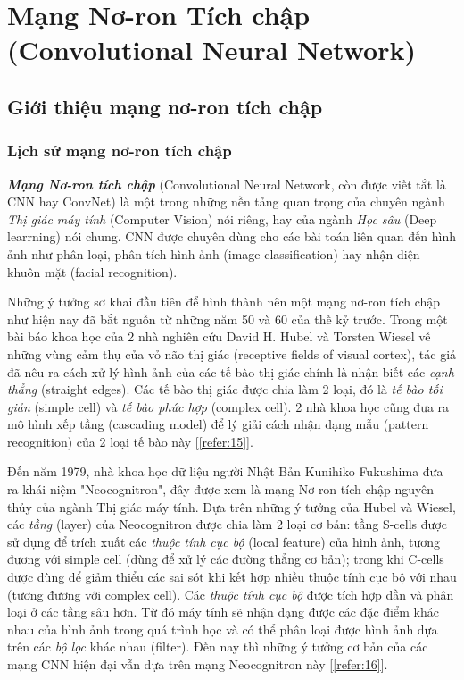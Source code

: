 \chapter{Mạng Nơ-ron Tích chập (Convolutional Neural Network)}

\section{Giới thiệu mạng nơ-ron tích chập}
\subsection{Lịch sử mạng nơ-ron tích chập}

\hspace{\parindent} \textit{\textbf{Mạng Nơ-ron tích chập}} (Convolutional Neural Network, còn được viết tắt là CNN hay ConvNet) là một trong những nền tảng quan trọng của chuyên ngành \textit{Thị giác máy tính} (Computer Vision) nói riêng, hay của ngành \textit{Học sâu} (Deep learrning) nói chung. CNN được chuyên dùng cho các bài toán liên quan đến hình ảnh như phân loại, phân tích hình ảnh (image classification) hay nhận diện khuôn mặt (facial recognition).

Những ý tưởng sơ khai đầu tiên để hình thành nên một mạng nơ-ron tích chập như hiện nay đã bắt nguồn từ những năm 50 và 60 của thế kỷ trước. Trong một bài báo khoa học của 2 nhà nghiên cứu David H. Hubel và Torsten Wiesel về những vùng cảm thụ của vỏ não thị giác (receptive fields of visual cortex), tác giả đã nêu ra cách xử lý hình ảnh của các tế bào thị giác chính là nhận biết các \textit{cạnh thẳng} (straight edges). Các tế bào thị giác được chia làm 2 loại, đó là \textit{tế bào tối giản} (simple cell) và \textit{tế bào phức hợp} (complex cell). 2 nhà khoa học cũng đưa ra mô hình xếp tầng (cascading model) để lý giải cách nhận dạng mẫu (pattern recognition) của 2 loại tế bào này [\ref{refer:15}].

Đến năm 1979, nhà khoa học dữ liệu người Nhật Bản Kunihiko Fukushima đưa ra khái niệm "Neocognitron", đây được xem là mạng Nơ-ron tích chập nguyên thủy của ngành Thị giác máy tính. Dựa trên những ý tưởng của Hubel và Wiesel, các \textit{tầng} (layer) của Neocognitron được chia làm 2 loại cơ bản: tầng S-cells được sử dụng để trích xuất các \textit{thuộc tính cục bộ} (local feature) của hình ảnh, tương đương với simple cell (dùng để xử lý các đường thẳng cơ bản); trong khi C-cells được dùng để giảm thiểu các sai sót khi kết hợp nhiều thuộc tính cục bộ với nhau (tương đương với complex cell). Các \textit{thuộc tính cục bộ }được tích hợp dần và phân loại ở các tầng sâu hơn. Từ đó máy tính sẽ nhận dạng được các đặc điểm khác nhau của hình ảnh trong quá trình học và có thể phân loại được hình ảnh dựa trên các \textit{bộ lọc} khác nhau (filter). Đến nay thì những ý tưởng cơ bản của các mạng CNN hiện đại vẫn dựa trên mạng Neocognitron này [\ref{refer:16}].

